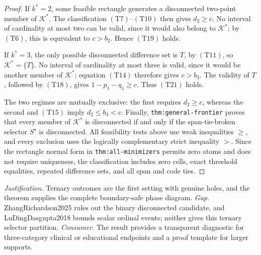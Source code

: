 \documentclass{article}
\begin{document}
\begin{proof}
If \(k^*=2\), some feasible rectangle generates a disconnected two-point member of \(\mathcal K^*\).  The classification \((\mathrm{T7})\)--\((\mathrm{T10})\) then gives \(d_2\geq c\).  No interval of cardinality at most two can be valid, since it would also belong to \(\mathcal K^*\); by \((\mathrm{T6})\), this is equivalent to \(c>b_2\).  Hence \((\mathrm{T19})\) holds.

If \(k^*=3\), the only possible disconnected difference set is \(T\), by \((\mathrm{T11})\), so \(\mathcal K^*=\{T\}\).  No interval of cardinality at most three is valid, since it would be another member of \(\mathcal K^*\); equation \((\mathrm{T14})\) therefore gives \(c>b_3\).  The validity of \(T\), followed by \((\mathrm{T18})\), gives \(1-p_1-q_1\geq c\).  Thus \((\mathrm{T21})\) holds.

The two regimes are mutually exclusive: the first requires \(d_2\geq c\), whereas the second and \((\mathrm{T15})\) imply \(d_2\leq b_3<c\).  Finally, \texttt{thm:general-frontier} proves that every member of \(\mathcal K^*\) is disconnected if and only if the span-tie-broken selector \(S^\star\) is disconnected.  All feasibility tests above use weak inequalities \(\geq\), and every exclusion uses the logically complementary strict inequality \(>\).  Since the rectangle normal form in \texttt{thm:all-minimizers} permits zero atoms and does not require uniqueness, the classification includes zero cells, exact threshold equalities, repeated difference sets, and all span and code ties.
\end{proof}
\par\smallskip\noindent \textit{Justification.} Ternary outcomes are the first setting with genuine holes, and the theorem supplies the complete boundary-safe phase diagram. \textit{Gap.} ZhangRichardson2025 rules out the binary disconnected candidate, and LuDingDasgupta2018 bounds scalar ordinal events; neither gives this ternary selector partition. \textit{Consumer.} The result provides a transparent diagnostic for three-category clinical or educational endpoints and a proof template for larger supports.
\end{document}
